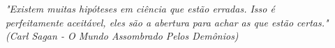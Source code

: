 \begin{epigrafe}
    \vspace*{\fill}
	\begin{flushright}
		\textit{"Existem muitas hipóteses em ciência que estão erradas. Isso é \\
		perfeitamente aceitável, eles são a abertura para achar as que estão certas." \\
		(Carl Sagan - O Mundo Assombrado Pelos Demônios)}
	\end{flushright}
\end{epigrafe}

